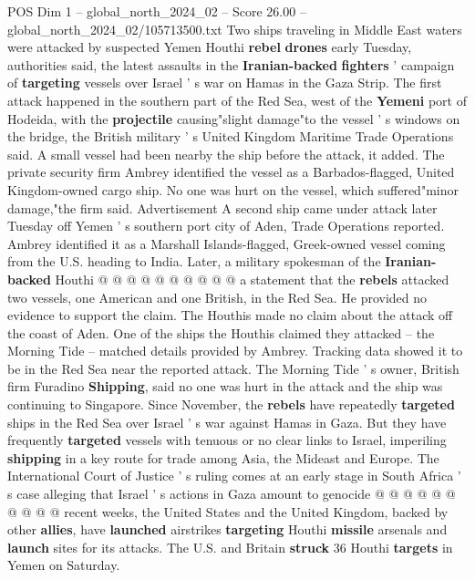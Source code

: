 \begin{textsample}{POS Dim 1 – global\_north\_2024\_02 – Score 26.00 – global\_north\_2024\_02/105713500.txt}  \label{ex:f1_pos_273}
Two ships traveling in Middle East waters were attacked by suspected Yemen Houthi \textbf{rebel} \textbf{drones} early Tuesday, authorities said, the latest assaults in the \textbf{Iranian-backed} \textbf{fighters} ' campaign of \textbf{targeting} vessels over Israel ' s war on Hamas in the Gaza Strip.
The first attack happened in the southern part of the Red Sea, west of the \textbf{Yemeni} port of Hodeida, with the \textbf{projectile} causing"slight damage"to the vessel ' s windows on the bridge, the British military ' s United Kingdom Maritime Trade Operations said.
A small vessel had been nearby the ship before the attack, it added.
The private security firm Ambrey identified the vessel as a Barbados-flagged, United Kingdom-owned cargo ship.
No one was hurt on the vessel, which suffered"minor damage,"the firm said.
Advertisement A second ship came under attack later Tuesday off Yemen ' s southern port city of Aden, Trade Operations reported.
Ambrey identified it as a Marshall Islands-flagged, Greek-owned vessel coming from the U.S. heading to India.
Later, a military spokesman of the \textbf{Iranian-backed} Houthi @ @ @ @ @ @ @ @ @ @ a statement that the \textbf{rebels} attacked two vessels, one American and one British, in the Red Sea.
He provided no evidence to support the claim.
The Houthis made no claim about the attack off the coast of Aden.
One of the ships the Houthis claimed they attacked -- the Morning Tide -- matched details provided by Ambrey.
Tracking data showed it to be in the Red Sea near the reported attack.
The Morning Tide ' s owner, British firm Furadino \textbf{Shipping}, said no one was hurt in the attack and the ship was continuing to Singapore.
Since November, the \textbf{rebels} have repeatedly \textbf{targeted} ships in the Red Sea over Israel ' s war against Hamas in Gaza.
But they have frequently \textbf{targeted} vessels with tenuous or no clear links to Israel, imperiling \textbf{shipping} in a key route for trade among Asia, the Mideast and Europe.
The International Court of Justice ' s ruling comes at an early stage in South Africa ' s case alleging that Israel ' s actions in Gaza amount to genocide @ @ @ @ @ @ @ @ @ @ recent weeks, the United States and the United Kingdom, backed by other \textbf{allies}, have \textbf{launched} airstrikes \textbf{targeting} Houthi \textbf{missile} arsenals and \textbf{launch} sites for its attacks.
The U.S. and Britain \textbf{struck} 36 Houthi \textbf{targets} in Yemen on Saturday.

\end{textsample}
